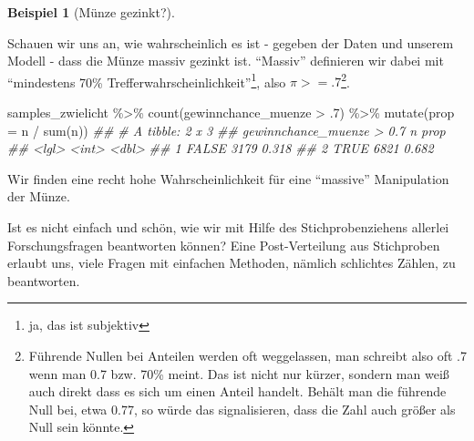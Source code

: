 \documentclass[
  a4paper,
  DIV=11]{scrreprt}
\newenvironment{Shaded}{\begin{snugshade}}{\end{snugshade}}
\newcommand{\AttributeTok}[1]{\textcolor[rgb]{0.40,0.45,0.13}{#1}}
\newcommand{\DecValTok}[1]{\textcolor[rgb]{0.68,0.00,0.00}{#1}}
\newcommand{\DocumentationTok}[1]{\textcolor[rgb]{0.37,0.37,0.37}{\textit{#1}}}
\newcommand{\FunctionTok}[1]{\textcolor[rgb]{0.28,0.35,0.67}{#1}}
\newcommand{\NormalTok}[1]{\textcolor[rgb]{0.00,0.23,0.31}{#1}}
\newcommand{\SpecialCharTok}[1]{\textcolor[rgb]{0.37,0.37,0.37}{#1}}
\theoremstyle{definition}
\newtheorem{example}{Beispiel}[chapter]
\theoremstyle{remark}
\begin{document}
\leavevmode{}%
\begin{example}[Münze gezinkt?]\label{exm-zwielicht2}

Schauen wir uns an, wie wahrscheinlich es ist - gegeben der Daten und
unserem Modell - dass die Münze massiv gezinkt ist. ``Massiv''
definieren wir dabei mit ``mindestens 70\%
Trefferwahrscheinlichkeit''\footnote{ja, das ist subjektiv}, also
\(\pi >= .7\)\footnote{Führende Nullen bei Anteilen werden oft
  weggelassen, man schreibt also oft .7 wenn man 0.7 bzw. 70\% meint.
  Das ist nicht nur kürzer, sondern man weiß auch direkt dass es sich um
  einen Anteil handelt. Behält man die führende Null bei, etwa 0.77, so
  würde das signalisieren, dass die Zahl auch größer als Null sein
  könnte.}.

\begin{Shaded}
\begin{Highlighting}[]
\NormalTok{samples\_zwielicht }\SpecialCharTok{\%\textgreater{}\%} 
  \FunctionTok{count}\NormalTok{(gewinnchance\_muenze }\SpecialCharTok{\textgreater{}}\NormalTok{ .}\DecValTok{7}\NormalTok{) }\SpecialCharTok{\%\textgreater{}\%} 
  \FunctionTok{mutate}\NormalTok{(}\AttributeTok{prop =}\NormalTok{ n }\SpecialCharTok{/} \FunctionTok{sum}\NormalTok{(n))}
\DocumentationTok{\#\# \# A tibble: 2 x 3}
\DocumentationTok{\#\#   \textasciigrave{}gewinnchance\_muenze \textgreater{} 0.7\textasciigrave{}     n  prop}
\DocumentationTok{\#\#   \textless{}lgl\textgreater{}                       \textless{}int\textgreater{} \textless{}dbl\textgreater{}}
\DocumentationTok{\#\# 1 FALSE                        3179 0.318}
\DocumentationTok{\#\# 2 TRUE                         6821 0.682}
\end{Highlighting}
\end{Shaded}

Wir finden eine recht hohe Wahrscheinlichkeit für eine ``massive''
Manipulation der Münze.

\end{example}

\begin{tcolorbox}[enhanced jigsaw, leftrule=.75mm, toptitle=1mm, bottomtitle=1mm, titlerule=0mm, breakable, colframe=quarto-callout-important-color-frame, title=\textcolor{quarto-callout-important-color}{\faExclamation}\hspace{0.5em}{Wichtig}, rightrule=.15mm, colback=white, arc=.35mm, left=2mm, bottomrule=.15mm, coltitle=black, opacitybacktitle=0.6, toprule=.15mm, colbacktitle=quarto-callout-important-color!10!white, opacityback=0]
Ist es nicht einfach und schön, wie wir mit Hilfe des Stichprobenziehens
allerlei Forschungsfragen beantworten können? Eine Post-Verteilung aus
Stichproben erlaubt uns, viele Fragen mit einfachen Methoden, nämlich
schlichtes Zählen, zu beantworten.
\end{tcolorbox}
\end{document}
